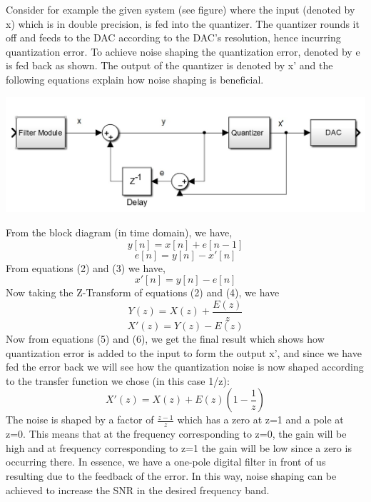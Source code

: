 \documentclass[colorlinks=true,pdfstartview=FitV,linkcolor=blue,
            citecolor=red,urlcolor=magenta]{ligodoc}
\begin{document}
Consider for example the given system (see figure) where the input (denoted by x) which is in double precision, is fed into the quantizer. The quantizer rounds it off and feeds to the DAC according to the DAC's resolution, hence incurring quantization error. To achieve noise shaping the quantization error, denoted by e is fed back as shown. The output of the quantizer is denoted by x' and the following equations explain how noise shaping is beneficial.
\begin{center}
\includegraphics[scale=0.5]{NoiseShaping} 
\end{center}
From the block diagram (in time domain), we have,
\begin{equation}
y[n]=x[n]+e[n-1]
\end{equation}
\begin{equation}
e[n]=y[n]-x'[n]
\end{equation}
From equations (2) and (3) we have,
\begin{equation}
x'[n]=y[n]-e[n]
\end{equation}
Now taking the Z-Transform of equations (2) and (4), we have
\begin{equation}
Y(z)=X(z)+\frac{E(z)}{z}
\end{equation}
\begin{equation}
X'(z)=Y(z)-E(z)
\end{equation}
Now from equations (5) and (6), we get the final result which shows how quantization error is added to the input to form the output x', and since we have fed the error back we will see how the quantization noise is now shaped according to the transfer function we chose (in this case 1/z):
\begin{equation}
X'(z)=X(z)+E(z)(1-\frac{1}{z})
\end{equation}
The noise is shaped by a factor of $\frac{z-1}{z}$ which has a zero at z=1 and a pole at z=0. This means that at the frequency corresponding to z=0, the gain will be high and at frequency corresponding to z=1 the gain will be low since a zero is occurring there. In essence, we have a one-pole digital filter in front of us resulting due to the feedback of the error. In this way, noise shaping can be achieved to increase the SNR in the desired frequency band.
\end{document}
